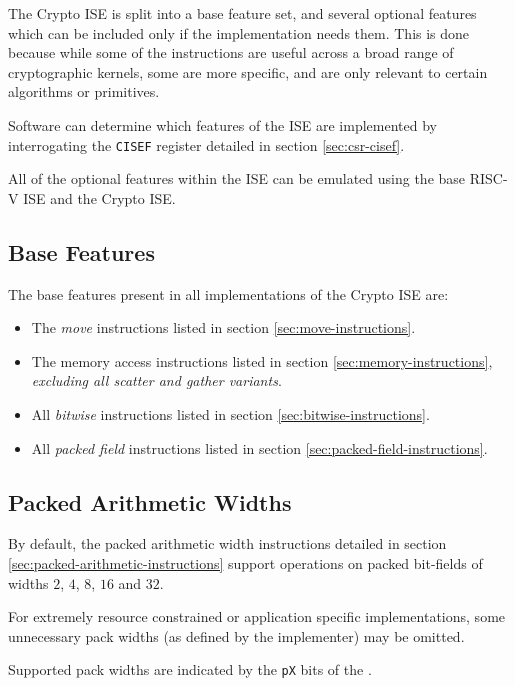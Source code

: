 
\label{sec:feature-sets}

The Crypto ISE is split into a base feature set, and several optional
features which can be included only if the implementation needs them.
This is done because while some of the instructions are useful across a
broad range of cryptographic kernels, some are more specific, and are only
relevant to certain algorithms or primitives.

Software can determine which features of the ISE are implemented by
interrogating the {\tt CISEF} register detailed in section
\ref{sec:csr-cisef}.

All of the optional features within the ISE can be emulated using the
base RISC-V ISE and the Crypto ISE.

\subsection{Base Features}

The base features present in all implementations of the Crypto ISE are:
\begin{itemize}
\item The {\em move} instructions listed in section
    \ref{sec:move-instructions}.
\item The memory access instructions listed in section
    \ref{sec:memory-instructions}, {\em excluding all scatter and gather
    variants}.
\item All {\em bitwise} instructions listed in section
    \ref{sec:bitwise-instructions}.
\item All {\em packed field} instructions listed in section
    \ref{sec:packed-field-instructions}.
\end{itemize}

\subsection{Packed Arithmetic Widths}

By default, the packed arithmetic width instructions detailed in
section \ref{sec:packed-arithmetic-instructions} support operations on
packed bit-fields of widths $2$, $4$, $8$, $16$ and $32$.

For extremely resource constrained or application specific implementations,
some unnecessary pack widths (as defined by the implementer) may be omitted.

Supported pack widths are indicated by the {\tt pX} bits of the
.


